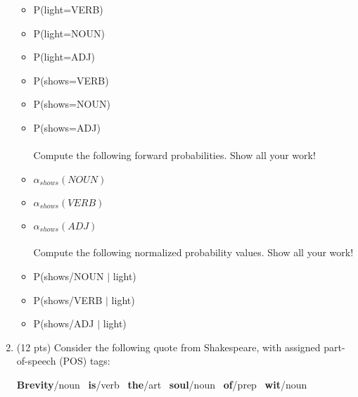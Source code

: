 \documentclass[11pt]{article}
\begin{document}
\begin{enumerate}
\begin{itemize}

\item P(light=VERB)  \\

\item P(light=NOUN)  \\

\item P(light=ADJ) \\

\item P(shows=VERB) \\

\item P(shows=NOUN) \\

\item P(shows=ADJ) \\ ~ \\


\hspace*{-.5in}
Compute the following forward probabilities.  Show all your work! \\

\item $\alpha_{shows}(NOUN)$ \\
\item $\alpha_{shows}(VERB)$ \\
\item $\alpha_{shows}(ADJ)$ \\ ~ \\


\hspace*{-.5in} Compute the following normalized probability
values. Show all  your work! \\

\item P(shows/NOUN $\mid$ light) \\
\item P(shows/VERB $\mid$ light) \\
\item P(shows/ADJ $\mid$ light) \\
\end{itemize}


\newpage

\item (12 pts) Consider the following quote from Shakespeare, with
  assigned part-of-speech (POS) tags:
\begin{center}
{\bf Brevity}/{\sc noun~} {\bf is}/{\sc verb~} {\bf the}/{\sc art~} {\bf
  soul}/{\sc noun~} {\bf of}/{\sc prep~} {\bf wit}/{\sc noun}
\end{center}


\end{enumerate}
\end{document}
